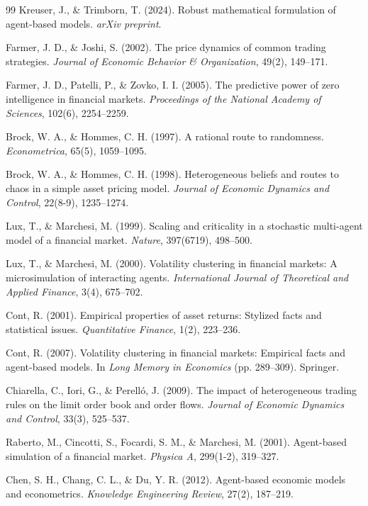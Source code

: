 \begin{thebibliography}{99}
Kreuser, J., \& Trimborn, T. (2024). Robust mathematical formulation of agent-based models. \textit{arXiv preprint}.

Farmer, J. D., \& Joshi, S. (2002). The price dynamics of common trading strategies. \textit{Journal of Economic Behavior \& Organization}, 49(2), 149--171.

Farmer, J. D., Patelli, P., \& Zovko, I. I. (2005). The predictive power of zero intelligence in financial markets. \textit{Proceedings of the National Academy of Sciences}, 102(6), 2254--2259.

Brock, W. A., \& Hommes, C. H. (1997). A rational route to randomness. \textit{Econometrica}, 65(5), 1059--1095.

Brock, W. A., \& Hommes, C. H. (1998). Heterogeneous beliefs and routes to chaos in a simple asset pricing model. \textit{Journal of Economic Dynamics and Control}, 22(8-9), 1235--1274.

Lux, T., \& Marchesi, M. (1999). Scaling and criticality in a stochastic multi-agent model of a financial market. \textit{Nature}, 397(6719), 498--500.

Lux, T., \& Marchesi, M. (2000). Volatility clustering in financial markets: A microsimulation of interacting agents. \textit{International Journal of Theoretical and Applied Finance}, 3(4), 675--702.

Cont, R. (2001). Empirical properties of asset returns: Stylized facts and statistical issues. \textit{Quantitative Finance}, 1(2), 223--236.

Cont, R. (2007). Volatility clustering in financial markets: Empirical facts and agent-based models. In \textit{Long Memory in Economics} (pp. 289--309). Springer.

Chiarella, C., Iori, G., \& Perell\'{o}, J. (2009). The impact of heterogeneous trading rules on the limit order book and order flows. \textit{Journal of Economic Dynamics and Control}, 33(3), 525--537.

Raberto, M., Cincotti, S., Focardi, S. M., \& Marchesi, M. (2001). Agent-based simulation of a financial market. \textit{Physica A}, 299(1-2), 319--327.

Chen, S. H., Chang, C. L., \& Du, Y. R. (2012). Agent-based economic models and econometrics. \textit{Knowledge Engineering Review}, 27(2), 187--219.


\end{thebibliography}
